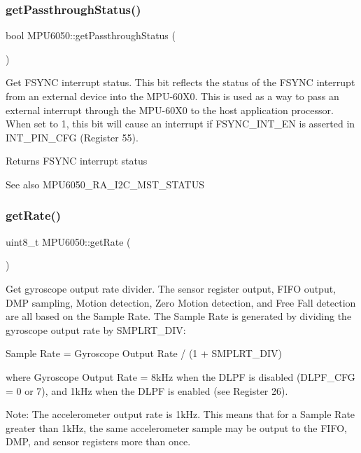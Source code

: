 \subsubsection{\texorpdfstring{getPassthroughStatus()}{getPassthroughStatus()}}
{\footnotesize\ttfamily bool M\+P\+U6050\+::get\+Passthrough\+Status (\begin{DoxyParamCaption}{ }\end{DoxyParamCaption})}

Get F\+S\+Y\+NC interrupt status. This bit reflects the status of the F\+S\+Y\+NC interrupt from an external device into the M\+P\+U-\/60\+X0. This is used as a way to pass an external interrupt through the M\+P\+U-\/60\+X0 to the host application processor. When set to 1, this bit will cause an interrupt if F\+S\+Y\+N\+C\+\_\+\+I\+N\+T\+\_\+\+EN is asserted in I\+N\+T\+\_\+\+P\+I\+N\+\_\+\+C\+FG (Register 55). \begin{DoxyReturn}{Returns}
F\+S\+Y\+NC interrupt status 
\end{DoxyReturn}
\begin{DoxySeeAlso}{See also}
M\+P\+U6050\+\_\+\+R\+A\+\_\+\+I2\+C\+\_\+\+M\+S\+T\+\_\+\+S\+T\+A\+T\+US 
\end{DoxySeeAlso}
\mbox{\label{class_m_p_u6050_a887a173e079980505763ffd1aa9fec05}} 
\subsubsection{\texorpdfstring{getRate()}{getRate()}}
{\footnotesize\ttfamily uint8\+\_\+t M\+P\+U6050\+::get\+Rate (\begin{DoxyParamCaption}{ }\end{DoxyParamCaption})}

Get gyroscope output rate divider. The sensor register output, F\+I\+FO output, D\+MP sampling, Motion detection, Zero Motion detection, and Free Fall detection are all based on the Sample Rate. The Sample Rate is generated by dividing the gyroscope output rate by S\+M\+P\+L\+R\+T\+\_\+\+D\+IV\+:

Sample Rate = Gyroscope Output Rate / (1 + S\+M\+P\+L\+R\+T\+\_\+\+D\+IV)

where Gyroscope Output Rate = 8k\+Hz when the D\+L\+PF is disabled (D\+L\+P\+F\+\_\+\+C\+FG = 0 or 7), and 1k\+Hz when the D\+L\+PF is enabled (see Register 26).

Note\+: The accelerometer output rate is 1k\+Hz. This means that for a Sample Rate greater than 1k\+Hz, the same accelerometer sample may be output to the F\+I\+FO, D\+MP, and sensor registers more than once.

